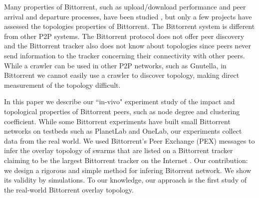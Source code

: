 \documentclass[10pt,conference,letterpaper]{IEEEtran}
\begin{document}
Many properties of Bittorrent, such as upload/download performance and peer arrival and departure processes, have been studied \cite{guo2005measurements}, but only a few projects have assessed the topologies properties of Bittorrent.
The Bittorrent system is different from other P2P systems.
The Bittorrent protocol does not offer peer discovery and the Bittorrent tracker also does not know about topologies since peers never send information to the tracker concerning their connectivity with other peers. 
While a crawler can be used in other P2P networks, such as Gnutella, in Bittorrent we cannot easily use a crawler to discover topology, making direct measurement of the topology difficult.

In this paper we describe our ``in-vivo" experiment study of the impact and topological properties of Bittorrent peers, such as node degree and clustering coefficient.  
While some Bittorrent experiments have built small Bittorrent networks on testbeds such as PlanetLab and OneLab, our experiments collect data from the real world. 
We used Bittorrent's Peer Exchange (PEX) messages to infer the overlay topology of swarms that are listed on a Bittorrent tracker claiming to be the largest Bittorrent tracker on the Internet \cite{piratebay}\cite{zhang2010unraveling}.
Our contribution: we design a rigorous and simple method for infering Bitorrent network. 
We show its validity by simulations.
To our knowledge, our approach is the first study of the real-world Bittorrent overlay topology.
\end{document}

